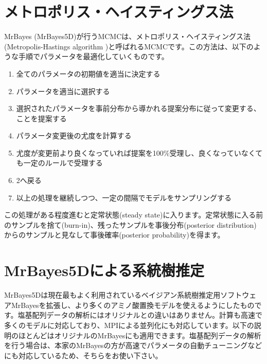 \documentclass[titlepage,10pt,a4paper]{jsbook}
\begin{document}
\section{メトロポリス・ヘイスティングス法}

MrBayes (MrBayes5D)が行うMCMCは、メトロポリス・ヘイスティングス法(Metropolis-Hastings algorithm \citep{Metropolis1953,Hastings1970})と呼ばれるMCMCです。この方法は、以下のような手順でパラメータを最適化していくものです。
\begin{enumerate}\small\setlength{\baselineskip}{1.1em}
\item 全てのパラメータの初期値を適当に決定する
\item パラメータを適当に選択する
\item 選択されたパラメータを事前分布から導かれる提案分布に従って変更する、ことを提案する
\item パラメータ変更後の尤度を計算する
\item 尤度が変更前より良くなっていれば提案を100\%受理し、良くなっていなくても一定のルールで受理する
\item 2へ戻る
\item 以上の処理を継続しつつ、一定の間隔でモデルをサンプリングする
\end{enumerate}
この処理がある程度進むと定常状態(steady state)に入ります。定常状態に入る前のサンプルを捨て(burn-in)、残ったサンプルを事後分布(posterior distribution)からのサンプルと見なして事後確率(posterior probability)を得ます。

\section{MrBayes5Dによる系統樹推定}

MrBayes5Dは現在最もよく利用されているベイジアン系統樹推定用ソフトウェアMrBayesを拡張し、より多くのアミノ酸置換モデルを使えるようにしたものです。塩基配列データの解析にはオリジナルとの違いはありません。計算も高速で多くのモデルに対応しており、MPIによる並列化にも対応しています。以下の説明のほとんどはオリジナルのMrBayesにも適用できます。塩基配列データの解析を行う場合は、本家のMrBayesの方が高速でパラメータの自動チューニングなどにも対応しているため、そちらをお使い下さい。
\end{document}
